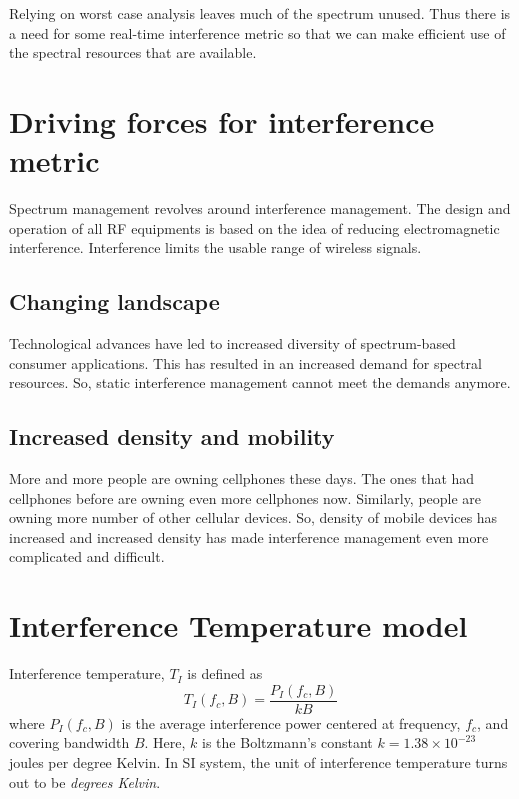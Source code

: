\documentclass[12pt]{article}
\begin{document}
Relying on worst case analysis leaves much of the spectrum unused. Thus there is a need for some real-time interference metric so that we can make efficient use of the spectral resources that are available.

\section{Driving forces for interference metric}

Spectrum management revolves around interference management\cite{kolodzy2006}. The design and operation of all RF equipments is based on the idea of reducing electromagnetic interference. Interference limits the usable range of wireless signals.

\subsection*{Changing landscape}

Technological advances have led to increased diversity of spectrum-based consumer applications. This has resulted in an increased demand for spectral resources. So, static interference management cannot meet the demands anymore.

\subsection*{Increased density and mobility}

More and more people are owning cellphones these days. The ones that had cellphones before are owning even more cellphones now. Similarly, people are owning more number of other cellular devices. So, density of mobile devices has increased and increased density has made interference management even more complicated and difficult.

\section{Interference Temperature model}
Interference temperature, $T_I$ is defined\cite{clancy2006, kolodzy2006} as
\begin{equation*} 
    T_I(f_c , B) = \frac{P_I(f_c , B)}{kB}
\end{equation*}
where $P_I(f_c,B)$ is the average interference power centered at frequency, $f_c$, and covering bandwidth
$B$. Here, $k$ is the Boltzmann's constant $k = 1.38 \times 10^{-23} $ joules per degree Kelvin. In SI system, the unit of interference temperature turns out to be \emph{degrees Kelvin}.
\end{document}
